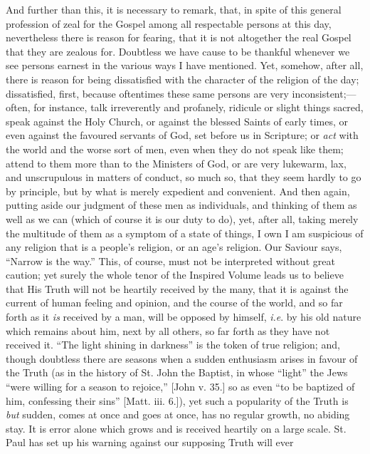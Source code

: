 And further than this, it is necessary to remark,
that, in spite of this general profession of zeal for the
Gospel among all respectable persons at this day,
nevertheless there is reason for fearing, that it is not
altogether the real Gospel that they are zealous for.
Doubtless we have cause to be thankful whenever we see
persons earnest in the various ways I have mentioned.
Yet, somehow, after all, there is reason for being
dissatisfied with the character of the religion of the
day; dissatisfied, first, because oftentimes these same
persons are very inconsistent;—often, for instance,
talk irreverently and profanely, ridicule or slight
things sacred, speak against the Holy Church, or against
the blessed Saints of early times, or even against the
favoured servants of God, set before us in Scripture; or \emph{act}
with the world and the worse sort of men, even when they
do not speak like them; attend to them more than to the
Ministers of God, or are very lukewarm, lax, and
unscrupulous in matters of conduct, so much so, that they
seem hardly to go by principle, but by what is merely
expedient and convenient. And then again, putting aside
our judgment of these men as individuals, and thinking of
them as well as we can (which of course it is our duty to
do), yet, after all, taking merely the multitude of them
as a symptom of a state of things, I own I am suspicious
of any religion that is a people's religion, or an age's
religion. Our Saviour says, ``Narrow is the
way.'' This, of course, must not be interpreted
without great caution; yet surely the whole tenor of the
Inspired Volume leads us to believe that His Truth will
not be heartily received by the many, that it is against
the current of human feeling and opinion, and the course
of the world, and so far forth as it \emph{is} received
by a man, will be opposed by himself, \emph{i.e}. by
his old nature which remains about him, next by all
others, so far forth as they have not received it.
``The light shining in darkness'' is the token of true religion; and, though doubtless there are seasons
when a sudden enthusiasm arises in favour of the Truth
(as in the history of St. John the Baptist, in whose
``light'' the Jews ``were willing for a
season to rejoice,'' [John v. 35.] so as even ``to
be baptized of him, confessing their sins'' [Matt.
iii. 6.]), yet such a popularity of the Truth is \emph{but}
sudden, comes at once and goes at once, has no regular
growth, no abiding stay. It is error alone which grows
and is received heartily on a large scale. St. Paul has
set up his warning against our supposing Truth will ever
